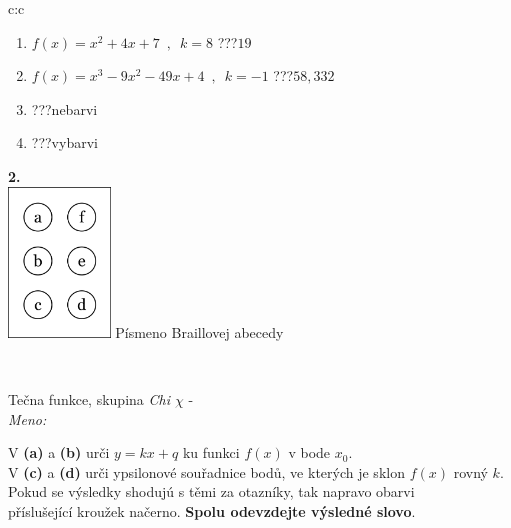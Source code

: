 \documentclass[10pt]{report}
\begin{document}
\begin{tabular}{c:c}
\begin{minipage}[c][104.5mm][t]{0.5\linewidth}
\begin{center}
\begin{minipage}{0.79\linewidth}
\begin{center}
\begin{varwidth}{\linewidth}
\begin{enumerate}
\item $f(x)=x^2+4x+7\enspace , \enspace k=8$\quad \dotfill\; ???\;\dotfill \quad $19$
\item $f(x)=x^3-9x^2-49x+4\enspace , \enspace k=-1$\quad \dotfill\; ???\;\dotfill \quad $58 , 332$
\item \quad \dotfill\; ???\;\dotfill \quad nebarvi
\item \quad \dotfill\; ???\;\dotfill \quad vybarvi
\end{enumerate}
\end{varwidth}
\end{center}
\end{minipage}
\begin{minipage}{0.20\linewidth}
\begin{center}
{\Huge\bfseries 2.} \\[2mm]
\includegraphics[height=40mm]{../images/braille.png}
{\small Písmeno Braillovej abecedy}
\end{center}
\end{minipage}
\end{center}
\end{minipage}
\\ \hdashline
\begin{minipage}[c][104.5mm][t]{0.5\linewidth}
\begin{center}
\vspace{7mm}
{\huge Tečna funkce, skupina \textit{Chi $\chi$} -}\\[5mm]
\textit{Meno:}\phantom{xxxxxxxxxxxxxxxxxxxxxxxxxxxxxxxxxxxxxxxxxxxxxxxxxxxxxxxxxxxxxxxxx}\\[5mm]
\begin{minipage}{0.95\linewidth}
\begin{center}
V \textbf{(a)} a \textbf{(b)} urči  $y = kx + q$ ku funkci $f(x)$ v bode $x_0$.\\V \textbf{(c)} a \textbf{(d)} urči ypsilonové souřadnice bodů, ve kterých je sklon $f(x)$ rovný $k$.\\Pokud se výsledky shodujú s těmi za otazníky, tak napravo obarvi\\příslušející kroužek načerno. \textbf{Spolu odevzdejte výsledné slovo}.

\end{center}
\end{minipage}
\end{center}
\end{minipage}
\end{tabular}
\end{document}
